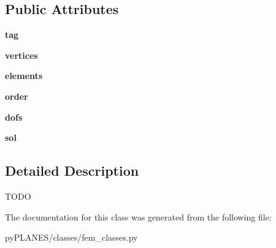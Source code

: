 \subsection*{Public Attributes}
\begin{DoxyCompactItemize}
\item 
\mbox{\label{classpy_p_l_a_n_e_s_1_1classes_1_1fem__classes_1_1_edge_a9785ce0b437f7ff68dc52308fb424e93}} 
{\bfseries tag}
\item 
\mbox{\label{classpy_p_l_a_n_e_s_1_1classes_1_1fem__classes_1_1_edge_a3355efc1f35654a5d7ff704d22ed38da}} 
{\bfseries vertices}
\item 
\mbox{\label{classpy_p_l_a_n_e_s_1_1classes_1_1fem__classes_1_1_edge_ace32c6f6a790faf9889e7ccb2529ebbc}} 
{\bfseries elements}
\item 
\mbox{\label{classpy_p_l_a_n_e_s_1_1classes_1_1fem__classes_1_1_edge_a9bcdaeb331419288b7603e3500798bc0}} 
{\bfseries order}
\item 
\mbox{\label{classpy_p_l_a_n_e_s_1_1classes_1_1fem__classes_1_1_edge_af0bb7ffc3bb8a4e5aaeed266ad18a221}} 
{\bfseries dofs}
\item 
\mbox{\label{classpy_p_l_a_n_e_s_1_1classes_1_1fem__classes_1_1_edge_aa7cc9cb266b94964101fd26c89773dbb}} 
{\bfseries sol}
\end{DoxyCompactItemize}


\subsection{Detailed Description}
\begin{DoxyVerb}TODO \end{DoxyVerb}
 

The documentation for this class was generated from the following file\+:\begin{DoxyCompactItemize}
\item 
py\+P\+L\+A\+N\+E\+S/classes/fem\+\_\+classes.\+py\end{DoxyCompactItemize}
